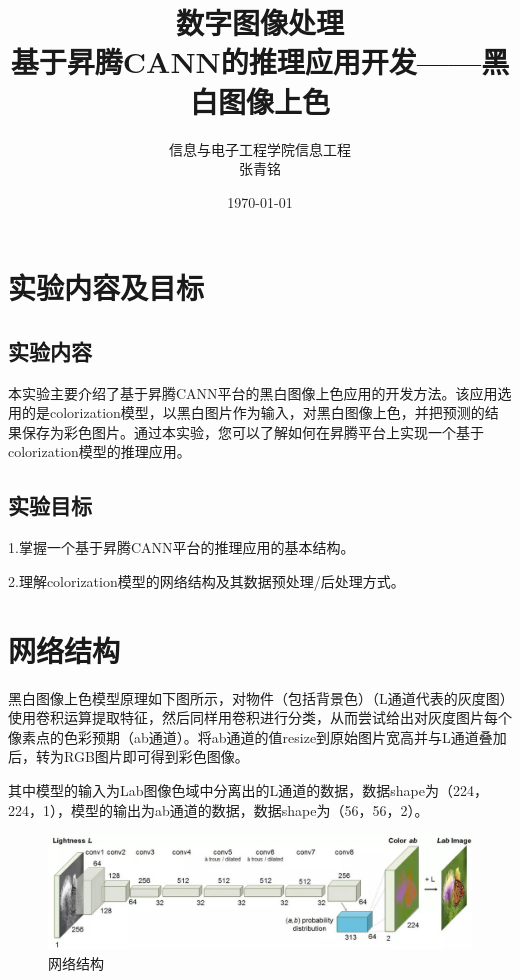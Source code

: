 \documentclass[12pt]{article}
\title{{\Huge{\textbf{数字图像处理}}}\\基于昇腾CANN的推理应用开发——黑白图像上色}
\author{信息与电子工程学院\quad 信息工程 \quad 3200105426\\张青铭}
\date{\today}
\begin{document}
\maketitle
\section{实验内容及目标}
\subsection{实验内容}
本实验主要介绍了基于昇腾CANN平台的黑白图像上色应用的开发方法。该应用选用的是colorization模型，以黑白图片作为输入，对黑白图像上色，并把预测的结果保存为彩色图片。通过本实验，您可以了解如何在昇腾平台上实现一个基于colorization模型的推理应用。

\subsection{实验目标}
1.掌握一个基于昇腾CANN平台的推理应用的基本结构。

2.理解colorization模型的网络结构及其数据预处理/后处理方式。
\section{网络结构}
黑白图像上色模型原理如下图所示，对物件（包括背景色）（L通道代表的灰度图）使用卷积运算提取特征，然后同样用卷积进行分类，从而尝试给出对灰度图片每个像素点的色彩预期（ab通道）。将ab通道的值resize到原始图片宽高并与L通道叠加后，转为RGB图片即可得到彩色图像。

其中模型的输入为Lab图像色域中分离出的L通道的数据，数据shape为（224，224，1），模型的输出为ab通道的数据，数据shape为（56，56，2）。
\begin{figure}[H]
	\centering
	\includegraphics[width=0.8\linewidth]{figures/net}
	\caption{网络结构}
\end{figure}
\end{document}
